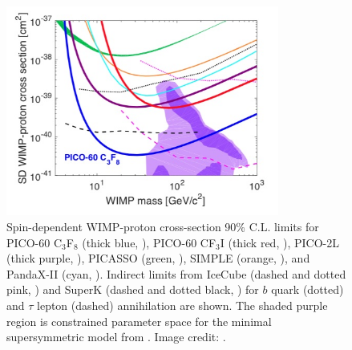 \begin{figure}
 \centering
 \includegraphics[width=0.8\textwidth]{spin_dependent_limits}
 \caption{Spin-dependent WIMP-proton cross-section 90\% C.L. limits for PICO-60 C$_{3}$F${_8}$ (thick blue, ), PICO-60
 CF$_{3}$I (thick red,
 ), PICO-2L (thick purple, ), PICASSO (green, ), SIMPLE (orange,
 ), and PandaX-II (cyan, ).  Indirect limits from IceCube
 (dashed and dotted pink, ) and SuperK (dashed and
 dotted black, ) for $b$ quark (dotted) and $\tau$ lepton (dashed)
 annihilation are shown.  The shaded purple region is constrained parameter space for the minimal
 supersymmetric model from .
 Image credit: .}
 \label{fig:sd_limits}
\end{figure}


